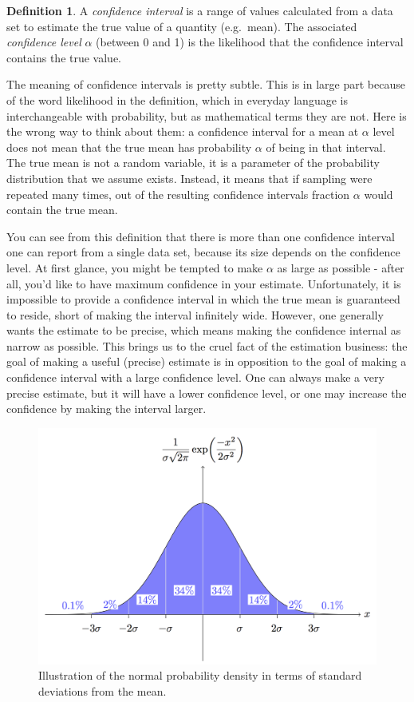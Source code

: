\documentclass[
]{book}
\theoremstyle{definition}
\newtheorem{definition}{Definition}[chapter]
\theoremstyle{definition}
\theoremstyle{definition}
\theoremstyle{remark}
\begin{document}
\begin{definition}
\protect\hypertarget{def:conf-int}{}{\label{def:conf-int} }A \emph{confidence interval} is a range of values calculated from a data set to estimate the true value of a quantity (e.g.~mean). The associated \emph{confidence level} \(\alpha\) (between 0 and 1) is the likelihood that the confidence interval contains the true value.
\end{definition}

The meaning of confidence intervals is pretty subtle. This is in large part because of the word likelihood in the definition, which in everyday language is interchangeable with probability, but as mathematical terms they are not. Here is the wrong way to think about them: a confidence interval for a mean at \(\alpha\) level does not mean that the true mean has probability \(\alpha\) of being in that interval. The true mean is not a random variable, it is a parameter of the probability distribution that we assume exists. Instead, it means that if sampling were repeated many times, out of the resulting confidence intervals fraction \(\alpha\) would contain the true mean.

You can see from this definition that there is more than one confidence interval one can report from a single data set, because its size depends on the confidence level. At first glance, you might be tempted to make \(\alpha\) as large as possible - after all, you'd like to have maximum confidence in your estimate. Unfortunately, it is impossible to provide a confidence interval in which the true mean is guaranteed to reside, short of making the interval infinitely wide. However, one generally wants the estimate to be precise, which means making the confidence internal as narrow as possible. This brings us to the cruel fact of the estimation business: the goal of making a useful (precise) estimate is in opposition to the goal of making a confidence interval with a large confidence level. One can always make a very precise estimate, but it will have a lower confidence level, or one may increase the confidence by making the interval larger.

\begin{figure}
\centering
\includegraphics{ch5/standard-deviation-tikz.png}
\caption{Illustration of the normal probability density in terms of standard deviations from the mean.}
\end{figure}
\end{document}
